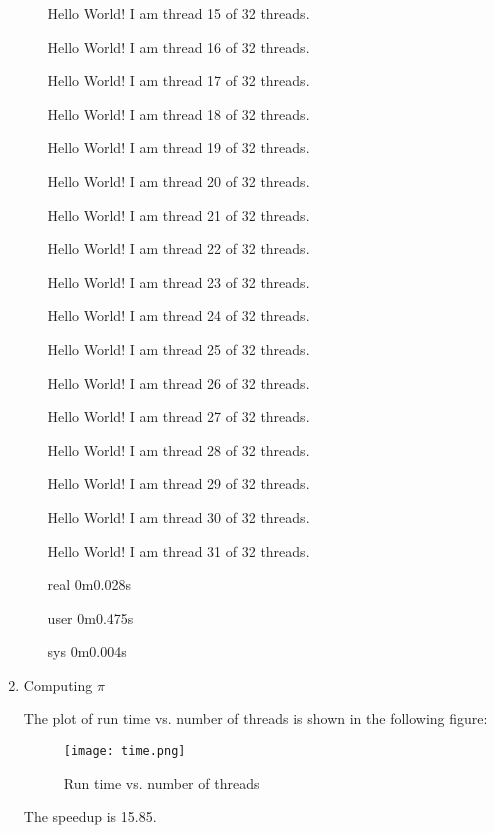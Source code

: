 \documentclass{article}
\begin{document}
\begin{enumerate}
\begin{enumerate}
Hello World! I am thread 15 of 32 threads.

Hello World! I am thread 16 of 32 threads.

Hello World! I am thread 17 of 32 threads.

Hello World! I am thread 18 of 32 threads.

Hello World! I am thread 19 of 32 threads.

Hello World! I am thread 20 of 32 threads.

Hello World! I am thread 21 of 32 threads.

Hello World! I am thread 22 of 32 threads.

Hello World! I am thread 23 of 32 threads.

Hello World! I am thread 24 of 32 threads.

Hello World! I am thread 25 of 32 threads.

Hello World! I am thread 26 of 32 threads.

Hello World! I am thread 27 of 32 threads.

Hello World! I am thread 28 of 32 threads.

Hello World! I am thread 29 of 32 threads.

Hello World! I am thread 30 of 32 threads.

Hello World! I am thread 31 of 32 threads.

real	0m0.028s

user	0m0.475s

sys	0m0.004s


\end{enumerate}

\item Computing $\pi$

The plot of run time vs. number of threads is shown in the following figure:

\begin{figure}[h]
\centering
\texttt{[image: time.png]}
\caption{Run time vs. number of threads}
\end{figure}

The speedup is 15.85.

\end{enumerate}
\end{document}
